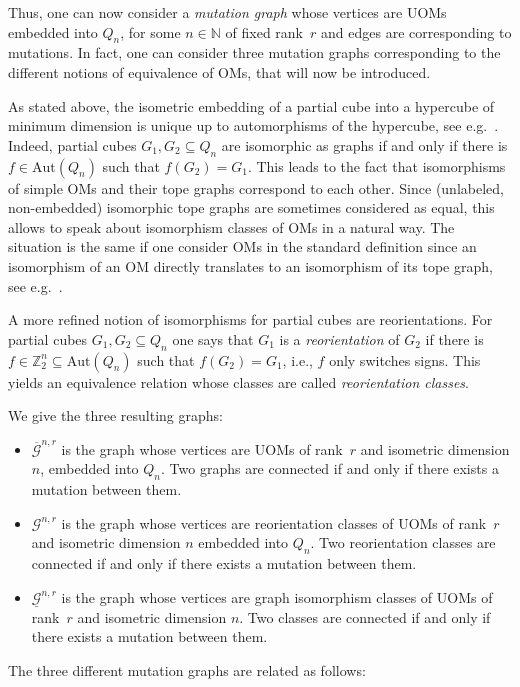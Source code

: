 \documentclass[final,11pt]{article}
\begin{document}
Thus, one can now consider a \emph{mutation graph} whose vertices are UOMs embedded into $Q_n$, for some $n\in \mathbb{N}$  of fixed rank~$r$ and edges are corresponding to mutations. In fact, one can consider three mutation graphs corresponding to the different notions of equivalence of OMs, that will now be introduced.

As stated above, the isometric embedding of a partial cube into a hypercube of minimum dimension is unique up to automorphisms of the hypercube, see e.g.~\cite[Chapter 5]{Ovc-11}. Indeed, partial cubes $G_1,G_2\subseteq Q_n$ are isomorphic as graphs if and only if there is $f\in\mathrm{Aut}(Q_n)$ such that $f(G_2)=G_1$. This leads to the fact that isomorphisms of simple OMs and their tope graphs correspond to each other. Since (unlabeled, non-embedded) isomorphic tope graphs are sometimes considered as equal, this allows to speak about isomorphism classes of OMs in a natural way. The situation is the same if one consider OMs in the standard definition since an isomorphism of an OM directly translates to an isomorphism of its tope graph, see e.g.~\cite{bjvestwhzi-93,Bjo-90}.
  

A more refined notion of isomorphisms for partial cubes are reorientations. For partial cubes $G_1,G_2\subseteq Q_n$ one says that $G_1$ is a \emph{reorientation} of $G_2$ if there is $f\in\mathbb{Z}_2^n\subseteq\mathrm{Aut}(Q_n)$ such that $f(G_2)=G_1$, i.e., $f$ only switches signs. This yields an equivalence relation whose classes are called \emph{reorientation classes}.

We give the three resulting graphs:
\begin{itemize}
\item $\overline{\mathcal{G}}^{n,r}$ is the graph whose vertices are UOMs of rank~$r$ and isometric dimension $n$, embedded into $Q_n$. Two graphs are connected if and only if there exists a mutation between them.
\item $\mathcal{G}^{n,r}$ is the graph whose vertices are reorientation classes of UOMs of rank~$r$ and isometric dimension $n$ embedded into $Q_n$. Two reorientation classes are connected if and only if there exists a mutation between them.
\item $\underline{\mathcal{G}}^{n,r}$ is the graph whose vertices are graph isomorphism classes of UOMs of rank~$r$ and isometric dimension $n$. Two classes are connected if and only if there exists a mutation between them.
\end{itemize}

The three different mutation graphs are related as follows:
\end{document}

